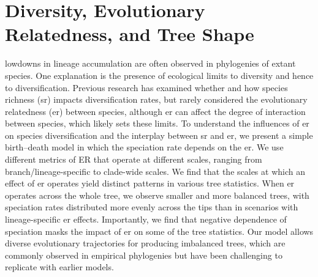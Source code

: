 \chapter{Diversity, Evolutionary Relatedness, and Tree Shape}
\label{chapter1}

lowdowns in lineage accumulation are often observed in phylogenies of extant species. One explanation is the presence of ecological limits to diversity and hence to diversification. Previous research has examined whether and how species richness (\acrshort{sr}) impacts diversification rates, but rarely considered the evolutionary relatedness (\acrshort{er}) between species, although \acrshort{er} can affect the degree of interaction between species, which likely sets these limits. To understand the influences of \acrshort{er} on species diversification and the interplay between \acrshort{sr} and \acrshort{er}, we present a simple birth--death model in which the speciation rate depends on the \acrshort{er}. We use different metrics of ER that operate at different scales, ranging from branch/lineage-specific to clade-wide scales. We find that the scales at which an effect of \acrshort{er} operates yield distinct patterns in various tree statistics. When \acrshort{er} operates across the whole tree, we observe smaller and more balanced trees, with speciation rates distributed more evenly across the tips than in scenarios with lineage-specific \acrshort{er} effects. Importantly, we find that negative  dependence of speciation masks the impact of \acrshort{er} on some of the tree statistics. Our model allows diverse evolutionary trajectories for producing imbalanced trees, which are commonly observed in empirical phylogenies but have been challenging to replicate with earlier models.

